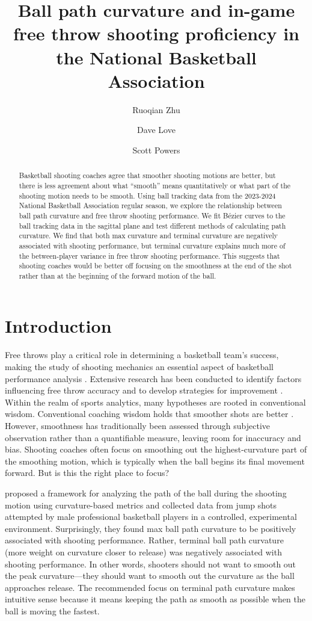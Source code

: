 \documentclass{article}
\title{Ball path curvature and in-game free throw shooting proficiency in the National Basketball Association}
\author[1]{Ruoqian Zhu}
\author[2]{Dave Love}
\author[3]{Scott Powers}
\affil[1]{Department of Mathematics, Rice University}
\affil[2]{NBA Shooting Coach}
\affil[3]{Department of Sport Management, Rice University}
\begin{document}
  \maketitle

  \begin{abstract}
    Basketball shooting coaches agree that smoother shooting motions are better, but there is less agreement about what ``smooth'' means quantitatively or what part of the shooting motion needs to be smooth. Using ball tracking data from the 2023-2024 National Basketball Association regular season, we explore the relationship between ball path curvature and free throw shooting performance. We fit Bézier curves to the ball tracking data in the sagittal plane and test different methods of calculating path curvature. We find that both max curvature and terminal curvature are negatively associated with shooting performance, but terminal curvature explains much more of the between-player variance in free throw shooting performance. This suggests that shooting coaches would be better off focusing on the smoothness at the end of the shot rather than at the beginning of the forward motion of the ball.
  \end{abstract}

  \section{Introduction}

    Free throws play a critical role in determining a basketball team's success, making the study of shooting mechanics an essential aspect of basketball performance analysis \citep{kozar_importance_1994}. Extensive research has been conducted to identify factors influencing free throw accuracy and to develop strategies for improvement \citep{tran_optimal_2008}. Within the realm of sports analytics, many hypotheses are rooted in conventional wisdom. Conventional coaching wisdom holds that smoother shots are better \citep{haefner_7_2010, penny_overlooked_2016}. However, smoothness has traditionally been assessed through subjective observation rather than a quantifiable measure, leaving room for inaccuracy and bias. Shooting coaches often focus on smoothing out the highest-curvature part of the smoothing motion, which is typically when the ball begins its final movement forward. But is this the right place to focus?
    
    \citet{slegers_role_2024} proposed a framework for analyzing the path of the ball during the shooting motion using curvature-based metrics and collected data from jump shots attempted by male professional basketball players in a controlled, experimental environment. Surprisingly, they found max ball path curvature to be positively associated with shooting performance. Rather, terminal ball path curvature (more weight on curvature closer to release) was negatively associated with shooting performance. In other words, shooters should not want to smooth out the peak curvature---they should want to smooth out the curvature as the ball approaches release. The recommended focus on terminal path curvature makes intuitive sense because it means keeping the path as smooth as possible when the ball is moving the fastest.
\end{document}
